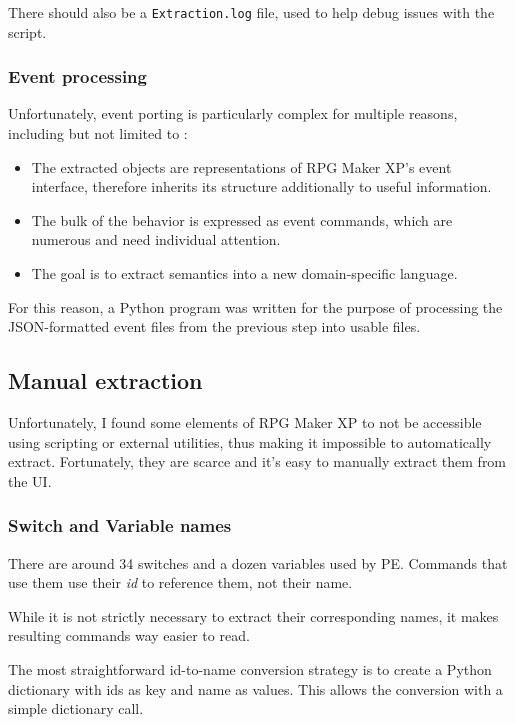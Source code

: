 \documentclass[11pt]{article}
\begin{document}
There should also be a \verb|Extraction.log| file, used to help debug issues with the script.



\subsubsection{Event processing}

Unfortunately, event porting is particularly complex for multiple reasons, including but not limited to :
\begin{itemize}
	\item The extracted objects are representations of RPG Maker XP's event interface, therefore inherits its structure additionally to useful information.
	
	\item The bulk of the behavior is expressed as event commands, which are numerous and need individual attention.
	
	\item The goal is to extract semantics into a new domain-specific language.
\end{itemize}

For this reason, a Python program was written for the purpose of processing the JSON-formatted event files from the previous step into usable files.



\subsection{Manual extraction}

Unfortunately, I found some elements of RPG Maker XP to not be accessible using scripting or external utilities, thus making it impossible to automatically extract. Fortunately, they are scarce and it's easy to manually extract them from the UI.

\subsubsection{Switch and Variable names}

There are around 34 switches and a dozen variables used by PE. Commands that use them use their \textit{id} to reference them, not their name.

While it is not strictly necessary to extract their corresponding names, it makes resulting commands way easier to read.

The most straightforward id-to-name conversion strategy is to create a Python dictionary with ids as key and name as values. This allows the conversion with a simple dictionary call.
\end{document}
